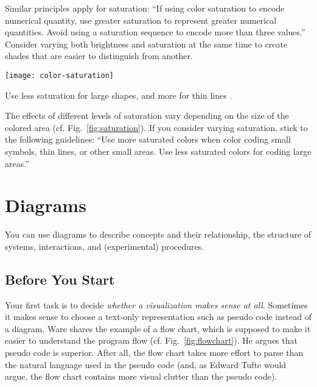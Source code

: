 Similar principles apply for saturation: ``If using color saturation to encode numerical quantity, use greater saturation to represent greater numerical quantities. Avoid using a saturation sequence to encode more than three values.'' \cite{Ware12} Consider varying both brightness and saturation at the same time to create shades that are easier to distinguish from another.

\begin{marginfigure}
\centering
\texttt{[image: color-saturation]}
\caption{\label{fig:saturation} Use less saturation for large shapes, and more for thin lines \cite{Ware12}.}%
\end{marginfigure}

The effects of different levels of saturation vary depending on the size of the colored area (cf. Fig.~\ref{fig:saturation}). If you consider varying saturation, stick to the following guidelines: ``Use more saturated colors when color coding small symbols, thin lines, or other small areas. Use less saturated colors for coding large areas.'' \cite{Ware12}



\section{Diagrams}

You can use diagrams to describe concepts and their relationship, the structure of systems, interactions, and (experimental) procedures.


\subsection{Before You Start}

Your first task is to decide \emph{whether a visualization makes sense at all}. Sometimes it makes sense to choose a text-only representation such as pseudo code instead of a diagram. Ware \cite{Ware12} shares the example of a flow chart, which is supposed to make it easier to understand the program flow (cf. Fig.~\ref{fig:flowchart}). He argues that pseudo code is superior. After all, the flow chart takes more effort to parse than the natural language used in the pseudo code (and, as Edward Tufte would argue, the flow chart contains more visual clutter than the pseudo code).

